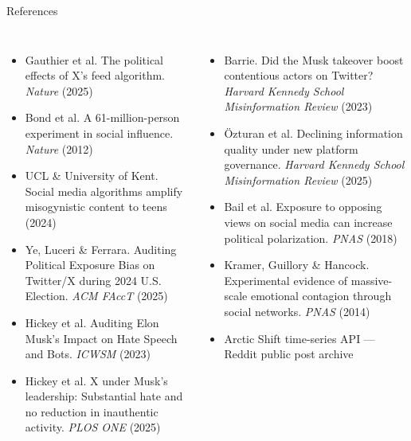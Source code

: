 \documentclass[aspectratio=169,t]{beamer}
\begin{document}
\begin{frame}{References}
\begin{columns}[T]
    \begin{itemize}\setlength\itemsep{0.3em}\scriptsize
      \item Gauthier et al. The political effects of X's feed algorithm. \textit{Nature} (2025)
      \item Bond et al. A 61-million-person experiment in social influence. \textit{Nature} (2012)
      \item UCL \& University of Kent. Social media algorithms amplify misogynistic content to teens (2024)
      \item Ye, Luceri \& Ferrara. Auditing Political Exposure Bias on Twitter/X during 2024 U.S. Election. \textit{ACM FAccT} (2025)
      \item Hickey et al. Auditing Elon Musk's Impact on Hate Speech and Bots. \textit{ICWSM} (2023)
      \item Hickey et al. X under Musk's leadership: Substantial hate and no reduction in inauthentic activity. \textit{PLOS ONE} (2025)
    \end{itemize}

    \begin{itemize}\setlength\itemsep{0.3em}\scriptsize
      \item Barrie. Did the Musk takeover boost contentious actors on Twitter? \textit{Harvard Kennedy School Misinformation Review} (2023)
      \item {\"O}zturan et al. Declining information quality under new platform governance. \textit{Harvard Kennedy School Misinformation Review} (2025)
      \item Bail et al. Exposure to opposing views on social media can increase political polarization. \textit{PNAS} (2018)
      \item Kramer, Guillory \& Hancock. Experimental evidence of massive-scale emotional contagion through social networks. \textit{PNAS} (2014)
      \item Arctic Shift time-series API — Reddit public post archive
    \end{itemize}
\end{columns}
\end{frame}
\end{document}
